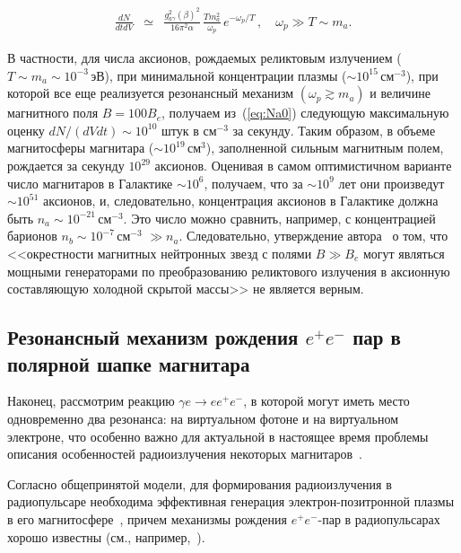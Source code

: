 %
\begin{eqnarray}
\label{eq:Na2}
\frac{dN}{dt dV} &\simeq&  \frac{g_{a\gamma}^2 (\beta)^2}{16 \pi^2 \alpha} \,
\frac{T m_a^2}{\omega_p}  \, e^{-\omega_p/T} \, , \quad \omega_p \gg T \sim m_a.
\end{eqnarray}
%



В частности, для числа аксионов, рождаемых реликтовым излучением 
($T \sim m_a \sim 10^{-3}$\,эВ), при  
 минимальной  концентрации плазмы ($\sim 10^{15}$\,см$^{-3}$), при которой все еще 
 реализуется  резонансный механизм $(\omega_p \gtrsim  m_a)$ и величине магнитного поля 
 $B=100B_e$, получаем из~(\ref{eq:Na0})  
следующую максимальную оценку $dN/(dV dt)\sim 10^{10}$ штук в см$^{-3}$ за секунду. 
 Таким образом, в объеме магнитосферы магнитара 
 ($\sim 10^{19}$\,см$^3$), заполненной сильным магнитным полем,  рождается за секунду 
 $10^{29}$ аксионов. Оценивая в самом оптимистичном варианте 
 число магнитаров в Галактике $\sim 10^6$, получаем, 
 что за $\sim 10^9$ лет они произведут $\sim 10^{51}$ аксионов, и, следовательно, 
 концентрация  аксионов в Галактике должна быть  $n_a \sim 10^{-21}$\,см$^{-3}$. Это число
 можно сравнить, например, с концентрацией барионов $n_b \sim 10^{-7}$\,см$^{-3}$ $\gg n_a$.  
 Следовательно, утверждение автора~\cite{Skobelev:2007} о том, что <<окрестности 
 магнитных нейтронных 
 звезд с полями $B \gg B_e$ могут являться мощными генераторами по преобразованию 
 реликтового излучения в аксионную составляющую холодной скрытой массы>> не является 
 верным.
 
 
 
 \subsection{Резонансный механизм рождения $e^+e^-$ пар  в полярной шапке магнитара}
Наконец, рассмотрим   реакцию $\gamma e \to e e^+e^-$, в которой могут иметь место одновременно два резонанса: 
на виртуальном фотоне и на виртуальном электроне, что особенно важно для актуальной в настоящее время  
проблемы  описания особенностей 
радиоизлучения некоторых магнитаров~\cite{Malofeev:2005r, Malofeev:2005,
Duncan:1995,Duncan:1996,Lyutikov:2002}.  

Согласно общепринятой модели, для 
формирования радиоизлучения  в радиопульсаре необходима эффективная генерация 
электрон-позитронной плазмы в его магнитосфере~\cite{Ruderman:1975}, 
причем механизмы рождения $e^+e^-$-пар 
в радиопульсарах хорошо известны (см., например,~\cite{Klepikov:1954,Erber:1966}).  

